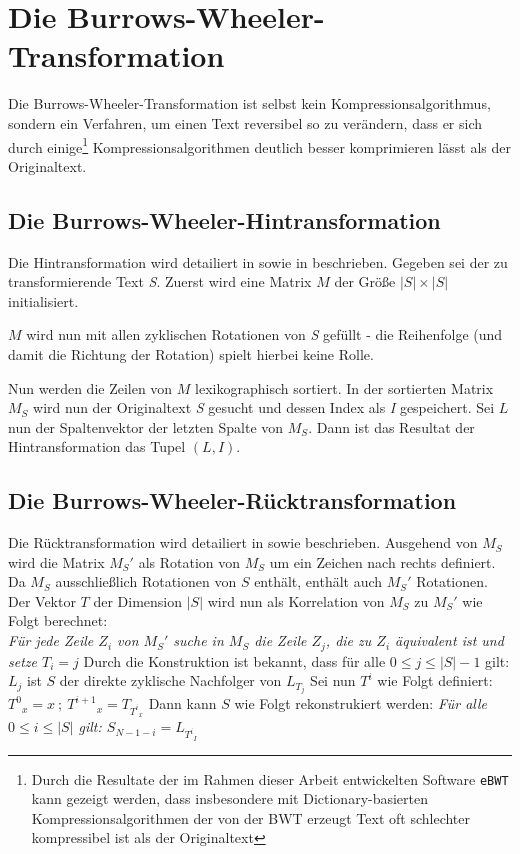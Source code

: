 \documentclass[ngerman,pdftex,paper=A4,DIV=calc,titlepage,12pt]{scrartcl}
\newtheorem[L]{boxedDefinition}{Definition}
\begin{document}
\section{Die Burrows-Wheeler-Transformation}
Die Burrows-Wheeler-Transformation ist selbst kein Kompressionsalgorithmus, sondern ein Verfahren, um einen Text reversibel so zu verändern, dass er sich durch einige\footnote{Durch die Resultate der im Rahmen dieser Arbeit entwickelten Software \texttt{eBWT} kann gezeigt werden, dass insbesondere mit Dictionary-basierten Kompressionsalgorithmen der von der BWT erzeugt Text oft schlechter kompressibel ist als der Originaltext} Kompressionsalgorithmen deutlich besser komprimieren lässt als der Originaltext.
\subsection{Die Burrows-Wheeler-Hintransformation}\label{ssec:transformation}
Die Hintransformation wird detailiert in \cite{Heun2003} sowie in \cite[Seite 2 - Algorithmus C]{burrows1994block} beschrieben.
Gegeben sei der zu transformierende Text \textit{S}. Zuerst wird eine Matrix $M$ der Größe $|S| \times |S|$ initialisiert.

$M$ wird nun mit allen zyklischen Rotationen von \textit{S} gefüllt - die Reihenfolge (und damit die Richtung der Rotation) spielt hierbei keine Rolle.

Nun werden die Zeilen von $M$ lexikographisch sortiert. In der sortierten Matrix $M_S$ wird nun der Originaltext \textit{S} gesucht und dessen Index als \textit{I} gespeichert. Sei $L$ nun der Spaltenvektor der letzten Spalte von $M_S$. Dann ist das Resultat der Hintransformation das Tupel $(L, I)$.
\subsection{Die Burrows-Wheeler-Rücktransformation}
\label{ssec:backtransformation}
Die Rücktransformation wird detailiert in \cite[Seite 3-5, Algorithmus D]{burrows1994block} sowie \cite{Heun2003} beschrieben.
Ausgehend von $M_S$ wird die Matrix $M_S'$ als Rotation von $M_S$ um ein Zeichen nach rechts definiert. Da $M_S$ ausschließlich Rotationen von $S$ enthält, enthält auch $M_S'$ Rotationen. Der Vektor $T$ der Dimension $|S|$ wird nun als Korrelation von $M_S$ zu $M_S'$ wie Folgt berechnet:\\
\textit{Für jede Zeile $Z_i$ von $M_S'$ suche in $M_S$ die Zeile $Z_j$, die zu $Z_i$ äquivalent ist und setze $T_i = j$}
Durch die Konstruktion ist bekannt, dass für alle $0 \leq j \leq |S|-1$ gilt: $L_j$ ist $S$ der direkte zyklische Nachfolger von $L_{T_j}$
Sei nun $T^i$ wie Folgt definiert: ${T^0}_x = x\ ;\ {T^{i+1}}_x = T_{{T^i}_x}$
Dann kann $S$ wie Folgt rekonstrukiert werden: \textit{Für alle $0 \leq i \leq |S|$ gilt: $S_{N-1-i} = L_{{T^i}_I}$}
\end{document}
